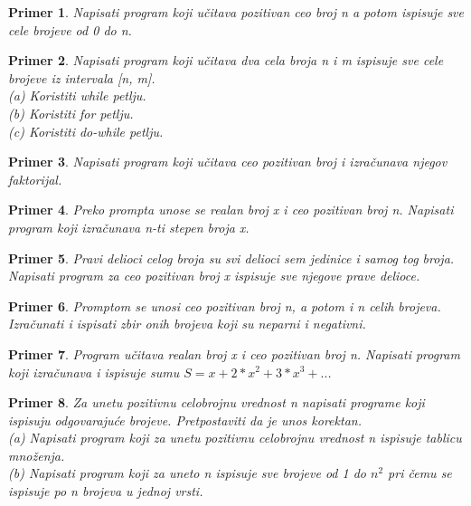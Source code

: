 \documentclass[a4paper]{article}
\newtheorem{primer}{Primer}[section]
\begin{document}
\begin{primer}
Napisati program koji učitava pozitivan ceo broj n a potom
ispisuje sve cele brojeve od 0 do n.
\end{primer}

\begin{primer}
Napisati program koji učitava dva cela broja n i m ispisuje
sve cele brojeve iz intervala [n, m].\\
(a) Koristiti while petlju.\\
(b) Koristiti for petlju.\\
(c) Koristiti do-while petlju.\\
\end{primer}

\begin{primer}
Napisati program koji učitava ceo pozitivan broj i izračunava
njegov faktorijal. 
\end{primer}

\begin{primer}
Preko prompta unose se realan broj x i ceo pozitivan
broj n. Napisati program koji izračunava n-ti stepen broja x.
\end{primer}

\begin{primer}
Pravi delioci celog broja su svi delioci sem jedinice i samog
tog broja. Napisati program za ceo pozitivan broj x ispisuje sve njegove
prave delioce.
\end{primer}

\begin{primer}
Promptom se unosi ceo pozitivan broj n, a potom i n celih
brojeva. Izračunati i ispisati zbir onih brojeva koji su neparni i negativni.
\end{primer}

\begin{primer}
Program učitava realan broj x i ceo pozitivan broj n.
Napisati program koji izračunava i ispisuje sumu $S=x + 2*x^2 + 3*x^3 + ..$.
\end{primer}

\begin{primer}
Za unetu pozitivnu celobrojnu vrednost n napisati programe
koji ispisuju odgovarajuće brojeve. Pretpostaviti da je unos korektan.\\
(a) Napisati program koji za unetu pozitivnu celobrojnu vrednost n ispisuje
tablicu množenja.\\
(b) Napisati program koji za uneto n ispisuje sve brojeve od 1 do $n^2$ pri čemu se ispisuje po n brojeva u jednoj vrsti.\\
\end{primer}
\end{document}

